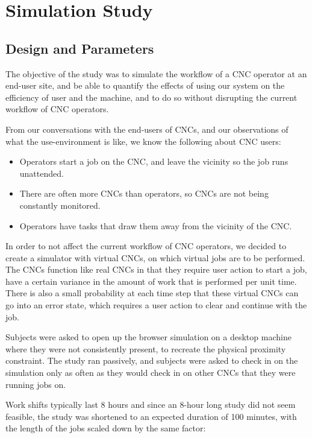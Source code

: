 \documentclass[12pt,letterpaper,titlepage]{article}
\newlength{\wideitemsep}
\let\olditem\item
\renewcommand{\item}{\setlength{\itemsep}{\wideitemsep}\olditem}
\begin{document}



\newpage
\section{Simulation Study} \label{sec:SimulationStudy}
\subsection{Design and Parameters}

The objective of the study was to simulate the workflow of a CNC operator at an end-user site, and be able to quantify the effects of using our system on the efficiency of user and the machine, and to do so without disrupting the current workflow of CNC operators.

From our conversations with the end-users of CNCs, and our observations of what the use-environment is like, we know the following about CNC users:
\begin{itemize}
\item Operators start a job on the CNC, and leave the vicinity so the job runs unattended.
\item There are often more CNCs than operators, so CNCs are not being constantly monitored.
\item Operators have tasks that draw them away from the vicinity of the CNC.
\end{itemize}

In order to not affect the current workflow of CNC operators, we decided to create a simulator with virtual CNCs, on which virtual jobs are to be performed. The CNCs function like real CNCs in that they require user action to start a job, have a certain variance in the amount of work that is performed per unit time. There is also a small probability at each time step that these virtual CNCs can go into an error state, which requires a user action to clear and continue with the job.

Subjects were asked to open up the browser simulation on a desktop machine where they were not consistently present, to recreate the physical proximity constraint. The study ran passively, and subjects were asked to check in on the simulation only as often as they would check in on other CNCs that they were running jobs on.

Work shifts typically last 8 hours and since an 8-hour long study did not seem feasible, the study was shortened to an expected duration of 100 minutes, with the length of the jobs scaled down by the same factor:
\end{document}
